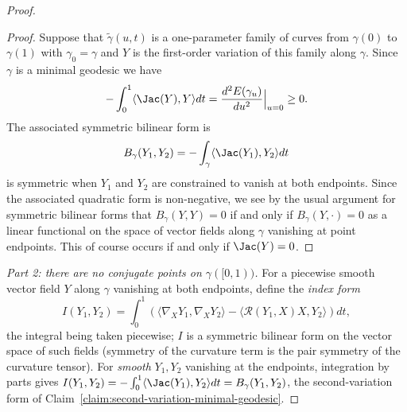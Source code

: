 \begin{proof}
\begin{proof}
Suppose that $\tilde\gamma(u,t)$ is a one-parameter family of curves
from $\gamma(0)$ to $\gamma(1)$ with $\gamma_0=\gamma$ and $Y$ is
the first-order variation of this family along $\gamma$.  Since
$\gamma$ is a minimal geodesic we have
$$-\int_0^1\langle \Jac(Y),Y\rangle dt=\frac{d^2E(\gamma_u)}{du^2}\Bigl|_{u=0}\Bigr.\ge 0.$$
 The associated symmetric bilinear form is
$$B_\gamma(Y_1,Y_2)=-\int_\gamma\langle \Jac(Y_1),Y_2\rangle dt$$
is symmetric when $Y_1$ and $Y_2$ are constrained to vanish at both
endpoints. Since the associated quadratic form is non-negative, we
see by the usual argument for symmetric bilinear forms that
$B_\gamma(Y,Y)=0$ if and only if $B_\gamma(Y,\cdot)=0$ as a linear
functional on the space of vector fields along $\gamma$ vanishing at
point endpoints. This of course occurs if and only if $\Jac(Y)=0$.
\end{proof}


\emph{Part 2: there are no conjugate points on $\gamma([0,1))$.}
For a piecewise smooth vector field $Y$ along $\gamma$ vanishing at
both endpoints, define the \emph{index form}
$$I(Y_1,Y_2)=\int_0^1\left(\langle\nabla_XY_1,\nabla_XY_2\rangle
-\langle{\mathcal R}(Y_1,X)X,Y_2\rangle\right)dt,$$
the integral being taken piecewise; $I$ is a symmetric bilinear form
on the vector space of such fields (symmetry of the curvature term
is the pair symmetry of the curvature tensor). For \emph{smooth}
$Y_1,Y_2$ vanishing at the endpoints, integration by parts gives
$I(Y_1,Y_2)=-\int_0^1\langle \Jac(Y_1),Y_2\rangle
dt=B_\gamma(Y_1,Y_2)$, the second-variation form of
Claim~\ref{claim:second-variation-minimal-geodesic}.


\end{proof}
